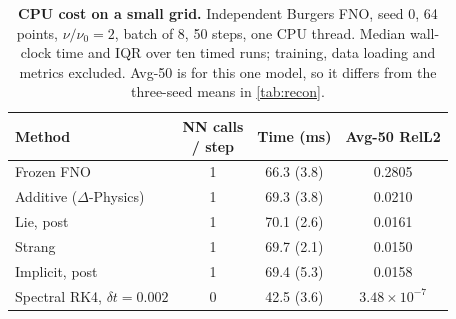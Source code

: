 \begin{table}[t]
\caption{\textbf{CPU cost on a small grid.} Independent Burgers FNO, seed 0, 64 points, $\nu/\nu_0=2$, batch of 8,
50 steps, one CPU thread. Median wall-clock time and IQR over ten timed runs; training, data loading and metrics
excluded. Avg-50 is for this one model, so it differs from the three-seed means in \cref{tab:recon}.}
\label{tab:cpu}
\centering
\footnotesize
\setlength{\tabcolsep}{3pt}
\begin{tabular}{@{}l c c c@{}}
\toprule
Method & \shortstack{NN calls\\/ step} & Time (ms) & Avg-50 RelL2 \\
\midrule
Frozen FNO & 1 & 66.3 (3.8) & 0.2805 \\
Additive ($\Delta$-Physics) & 1 & 69.3 (3.8) & 0.0210 \\
Lie, post & 1 & 70.1 (2.6) & 0.0161 \\
Strang & 1 & 69.7 (2.1) & 0.0150 \\
Implicit, post & 1 & 69.4 (5.3) & 0.0158 \\
\midrule
Spectral RK4, $\delta t=0.002$ & 0 & 42.5 (3.6) & $3.48\times10^{-7}$ \\
\bottomrule
\end{tabular}
\end{table}
